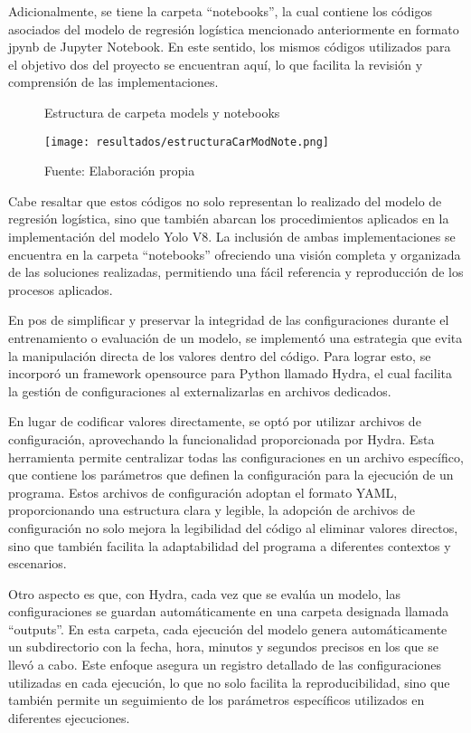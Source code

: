 Adicionalmente, se tiene la carpeta ``notebooks'', la cual contiene los códigos asociados del modelo de regresión logística mencionado anteriormente en formato jpynb de Jupyter Notebook. En este sentido, los mismos códigos utilizados para el objetivo dos del proyecto se encuentran aquí, lo que facilita la revisión y comprensión de las implementaciones.


\begin{figure}[h]
\centering
\caption{Estructura de carpeta models y notebooks}
\texttt{[image: resultados/estructuraCarModNote.png]}
\caption*{\footnotesize Fuente: Elaboración propia}
\label{fig:figuraEstructuraCarModNote}
\end{figure}

\newpage

Cabe resaltar que estos códigos no solo representan lo realizado del modelo de regresión logística, sino que también abarcan los procedimientos aplicados en la implementación del modelo Yolo V8. La inclusión de ambas implementaciones se encuentra en la carpeta ``notebooks'' ofreciendo una visión completa y organizada de las soluciones realizadas, permitiendo una fácil referencia y reproducción de los procesos aplicados. \newline

En pos de simplificar y preservar la integridad de las configuraciones durante el entrenamiento o evaluación de un modelo, se implementó una estrategia que evita la manipulación directa de los valores dentro del código. Para lograr esto, se incorporó un framework opensource para Python llamado Hydra, el cual facilita la gestión de configuraciones al externalizarlas en archivos dedicados.

\newpage

En lugar de codificar valores directamente, se optó por utilizar archivos de configuración, aprovechando la funcionalidad proporcionada por Hydra. Esta herramienta permite centralizar todas las configuraciones en un archivo específico, que contiene los parámetros que definen la configuración para la ejecución de un programa. Estos archivos de configuración adoptan el formato YAML, proporcionando una estructura clara y legible, la adopción de archivos de configuración no solo mejora la legibilidad del código al eliminar valores directos, sino que también facilita la adaptabilidad del programa a diferentes contextos y escenarios. \newline

Otro aspecto es que, con Hydra, cada vez que se evalúa un modelo, las configuraciones se guardan automáticamente en una carpeta designada llamada ``outputs''. En esta carpeta, cada ejecución del modelo genera automáticamente un subdirectorio con la fecha, hora, minutos y segundos precisos en los que se llevó a cabo. Este enfoque asegura un registro detallado de las configuraciones utilizadas en cada ejecución, lo que no solo facilita la reproducibilidad, sino que también permite un seguimiento de los parámetros específicos utilizados en diferentes ejecuciones.

